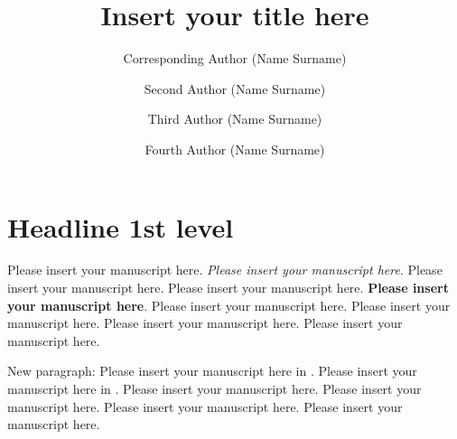 \documentclass[USenglish,twocolumn]{article}
\begin{document}
  \openaccess

  \title{Insert your title here}

  \author*[1]{Corresponding Author (Name Surname)}
  \author[2]{Second Author (Name Surname)}
  \author[2]{Third Author (Name Surname)}
  \author[3]{Fourth Author (Name Surname)}




  \maketitle

  \section{Headline 1st level}

  Please insert your manuscript here. \textit{Please insert your manuscript here}. Please insert your manuscript here. Please insert your manuscript here. \textbf{Please insert your manuscript here}. Please insert your manuscript here. Please insert your manuscript here. Please insert your manuscript here. Please insert your manuscript here.

  New paragraph: Please insert your manuscript here in \citep{2,3,4,5}. Please insert your manuscript here in \cite{1}. Please insert your manuscript here. Please insert your manuscript here. Please insert your manuscript here. Please insert your manuscript here.
\end{document}
